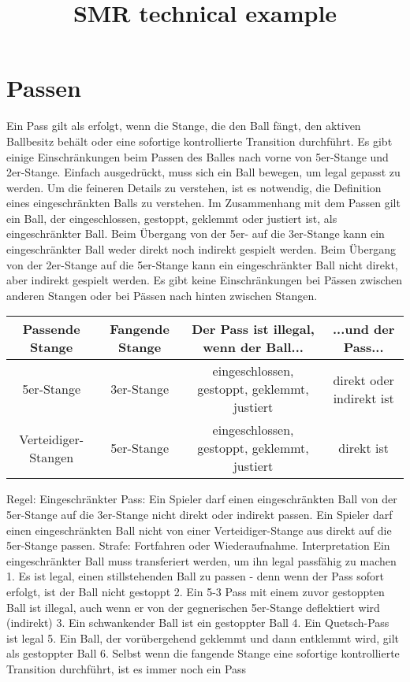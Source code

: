 \documentclass[fontsize=11pt, paper=a4]{report}
\begin{document}
\title{SMR technical example}
\maketitle

\pagestyle{plain}%

\chapter{Passen}
Ein Pass gilt als erfolgt, wenn die Stange, die den Ball fängt, den aktiven Ballbesitz behält oder eine sofortige kontrollierte Transition durchführt.
Es gibt einige Einschränkungen beim Passen des Balles nach vorne von 5er-Stange und 2er-Stange. Einfach ausgedrückt, muss sich ein Ball bewegen, um legal gepasst zu werden. Um die feineren Details zu verstehen, ist es notwendig, die Definition eines eingeschränkten Balls zu verstehen.
Im Zusammenhang mit dem Passen gilt ein Ball, der eingeschlossen, gestoppt, geklemmt oder justiert ist, als eingeschränkter Ball. Beim Übergang von der 5er- auf die 3er-Stange kann ein eingeschränkter Ball weder direkt noch indirekt gespielt werden. Beim Übergang von der 2er-Stange auf die 5er-Stange kann ein eingeschränkter Ball nicht direkt, aber indirekt gespielt werden.
Es gibt keine Einschränkungen bei Pässen zwischen anderen Stangen oder bei Pässen nach hinten zwischen Stangen.
\begin{tabular}{|c|c|c|c|}
\hline
Passende Stange & Fangende Stange & Der Pass ist illegal, wenn der Ball... & ...und der Pass...\\ \hline
5er-Stange 		& 3er-Stange		&eingeschlossen, gestoppt, geklemmt, justiert & direkt oder indirekt ist\\\hline
Verteidiger-Stangen & 5er-Stange & eingeschlossen, gestoppt, geklemmt, justiert & direkt ist\\\hline
\end{tabular}
Regel: Eingeschränkter Pass: Ein Spieler darf einen eingeschränkten Ball von der 5er-Stange auf die 3er-Stange nicht direkt oder indirekt passen. Ein Spieler darf einen eingeschränkten Ball nicht von einer Verteidiger-Stange aus direkt auf die 5er-Stange passen. Strafe: Fortfahren oder Wiederaufnahme.
Interpretation
Ein eingeschränkter Ball muss transferiert werden, um ihn legal passfähig zu machen
1. Es ist legal, einen stillstehenden Ball zu passen - denn wenn der Pass sofort erfolgt, ist der Ball nicht gestoppt
2. Ein 5-3 Pass mit einem zuvor gestoppten Ball ist illegal, auch wenn er von der gegnerischen 5er-Stange deflektiert wird (indirekt)
3. Ein schwankender Ball ist ein gestoppter Ball
4. Ein Quetsch-Pass ist legal
5. Ein Ball, der vorübergehend geklemmt und dann entklemmt wird, gilt als gestoppter Ball
6. Selbst wenn die fangende Stange eine sofortige kontrollierte Transition durchführt, ist es immer noch ein Pass


\end{document}
